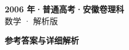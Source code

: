 \documentclass[zihao=-4, a4paper]{ctexart}
\begin{document}
\begin{center}
  {\Large\bfseries 2006 年·普通高考·安徽卷理科}\\[4pt]
  {\large 数学 · 解析版}
\end{center}
\medskip
{}

\clearpage
{}
\begin{center}{\Large\bfseries 参考答案与详细解析}\end{center}
\medskip

\end{document}
